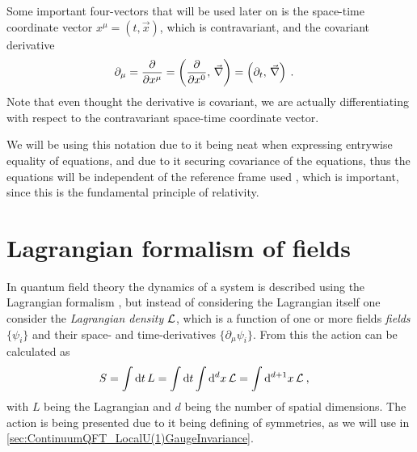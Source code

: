 \documentclass[../main.tex]{subfiles} %
\begin{document}
Some important four-vectors that will be used later on is the space-time coordinate vector $x^\mu = (t, \Vec{x})$, which is contravariant, and the covariant derivative
\begin{align}
    \partial_\mu &= \pdv{}{x^\mu} = \left(\pdv{}{x^0},\, \Vec{\nabla}\right) = \left(\partial_t,\, \Vec{\nabla}\right) \: .
\end{align}
Note that even thought the derivative is covariant, we are actually differentiating with respect to the contravariant space-time coordinate vector.

We will be using this notation due to it being neat when expressing entrywise equality of equations, and due to it securing covariance of the equations, thus the equations will be independent of the reference frame used \cite{Uggerhoej_SpecielRelativitetsteori_2016}, which is important, since this is the fundamental principle of relativity.










\section{Lagrangian formalism of fields}

In quantum field theory the dynamics of a system is described using the Lagrangian formalism \cite{peskin_introToQFT_1995,Clark_LagrangianQFT_1988}, but instead of considering the Lagrangian itself one consider the \emph{Lagrangian density} $\mathcal{L}$, which is a function of one or more fields \emph{fields} $\{\psi_i\}$ and their space- and time-derivatives $\{\partial_\mu \psi_i\}$. From this the action can be calculated as
\begin{align}
    S &= \int \dd{t} L = \int \dd{t} \int \dd[d]{x} \mathcal{L} = \int \dd[d+1]{x} \mathcal{L} \: ,
\end{align}
with $L$ being the Lagrangian and $d$ being the number of spatial dimensions. The action is being presented due to it being defining of symmetries, as we will use in \cref{sec:ContinuumQFT_LocalU(1)GaugeInvariance}.
\end{document}
